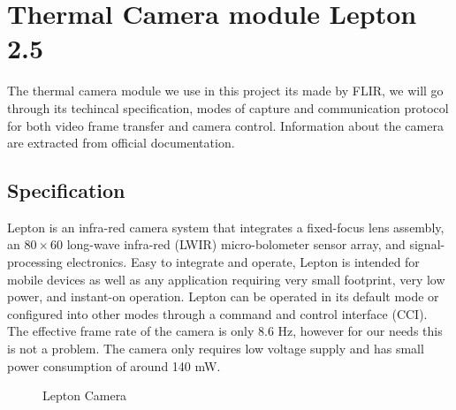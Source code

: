 \section{Thermal Camera module Lepton 2.5}
\label{sec:thermalcamera}
The thermal camera module we use in this project its made by FLIR, we will go
through its techincal specification, modes of capture and communication protocol
for both video frame transfer and camera control. Information about the camera
are extracted from official documentation.
\subsection{Specification}
\label{ssec:specificationthermalcam}
Lepton is an infra-red camera system that integrates a fixed-focus lens assembly,
an $80 \times 60$ long-wave infra-red (LWIR) micro-bolometer sensor array, and
signal-processing electronics. Easy to integrate and operate, Lepton is intended
for mobile devices as well as any application requiring very small
footprint, very low power, and instant-on operation. Lepton can be operated in
its default mode or configured into other modes through a command and control
interface (CCI). The effective frame rate of the camera is only 8.6 \si{\hertz},
however for our needs this is not a problem. The camera only requires low
voltage supply and has small power consumption of around 140 \si{\milli\watt}.
\begin{figure}[!htb]
    \centering
     \quad
    \caption{Lepton Camera}
    \label{fig:camerarender}
\end{figure}
%
